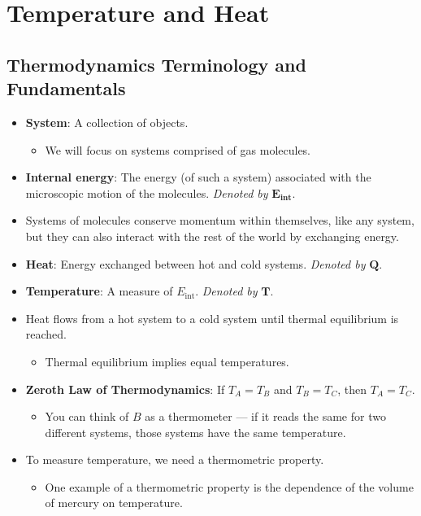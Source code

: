 \documentclass[../notes.tex]{subfiles}
\begin{document}
\chapter{Temperature and Heat}
\section{Thermodynamics Terminology and Fundamentals}
\begin{itemize}
    \item {}\textbf{System}: A collection of objects.
    \begin{itemize}
        \item We will focus on systems comprised of gas molecules.
    \end{itemize}
    \item \textbf{Internal energy}: The energy (of such a system) associated with the microscopic motion of the molecules. \emph{Denoted by} $\bm{E_\text{int}}$.
    \item Systems of molecules conserve momentum within themselves, like any system, but they can also interact with the rest of the world by exchanging energy.
    \item \textbf{Heat}: Energy exchanged between hot and cold systems. \emph{Denoted by} $\bm{Q}$.
    \item \textbf{Temperature}: A measure of $E_\text{int}$. \emph{Denoted by} $\bm{T}$.
    \item Heat flows from a hot system to a cold system until thermal equilibrium is reached.
    \begin{itemize}
        \item Thermal equilibrium implies equal temperatures.
    \end{itemize}
    \item \textbf{Zeroth Law of Thermodynamics}: If $T_A=T_B$ and $T_B=T_C$, then $T_A=T_C$.
    \begin{itemize}
        \item You can think of $B$ as a thermometer --- if it reads the same for two different systems, those systems have the same temperature.
    \end{itemize}
    \item To measure temperature, we need a thermometric property.
    \begin{itemize}
        \item One example of a thermometric property is the dependence of the volume of mercury on temperature.
        \begin{itemize}

\end{itemize}
\end{itemize}
\end{itemize}
\end{document}
